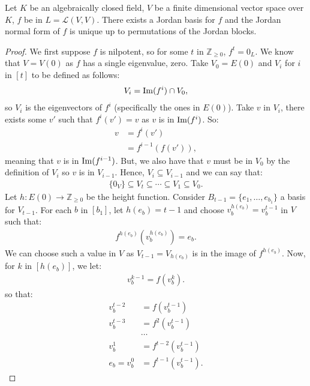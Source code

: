 Let $K$ be an algebraically closed field, $V$ be a finite dimensional 
vector space over $K$, $f$ be in $L = \mathcal{L}(V, V)$. There exists a Jordan
basis for $f$ and the Jordan normal form of $f$ is unique up to permutations
of the Jordan blocks.
\begin{proof}
    We first suppose $f$ is nilpotent, so for some $t$ in 
    $\mathbb{Z}_{\geq 0}$, $f^t = 0_L$. We know that $V = V(0)$
    as $f$ has a single eigenvalue, zero. Take $V_0 = E(0)$
    and $V_i$ for $i$ in $[t]$ to be defined as follows:
    \begin{gather*}
        V_i = \operatorname{Im}(f^i) \cap V_0,
    \end{gather*} so $V_i$ is the eigenvectors of $f^i$ (specifically
    the ones in $E(0)$). Take $v$ in $V_i$, 
    there exists some $v'$ such that $f^i(v') = v$ 
    as $v$ is in $\operatorname{Im}(f^i)$. So: \begin{align*}
        v &= f^i(v') \\
        &= f^{i - 1}(f(v')),
    \end{align*} meaning that $v$ is in $\operatorname{Im}(f^{i - 1})$. But, we also
    have that $v$ must be in $V_0$ by the definition of $V_i$ so
    $v$ is in $V_{i - 1}$. Hence, $V_i \subseteq V_{i - 1}$ and we 
    can say that: \begin{gather*}
        \{0_V\} \subseteq V_t \subseteq \cdots \subseteq V_1 \subseteq V_0.
    \end{gather*} Let $h : E(0) \to \mathbb{Z}_{\geq 0}$ be the height
    function.
    Consider $B_{t - 1} = \{e_1, \ldots, e_{b_1}\}$ a basis
    for $V_{t - 1}$. For each $b$ in $[b_1]$, let $h(e_b) = t - 1$ and
    choose $v_b^{h(e_b)} = v_b^{t - 1}$ in $V$ such that: \begin{gather*}
        f^{h(e_b)}(v_b^{h(e_b)}) = e_b.
    \end{gather*} We can choose such a value in $V$ as $V_{t - 1} = V_{h(e_b)}$
    is in the image of $f^{h(e_b)}$. Now, for $k$ in $[h(e_b)]$, we let: \begin{gather*}
        v_b^{k - 1} = f(v_b^k).
    \end{gather*} so that: \begin{align*}
        v_b^{t - 2} &= f(v_b^{t - 1}) \\
        v_b^{t - 3} &= f^2(v_b^{t - 1}) \\
        &\cdots \\
        v_b^1 &= f^{t - 2}(v_b^{t - 1}) \\
        e_b = v_b^0 &= f^{t - 1}(v_b^{t - 1}).
    \end{align*}

\end{proof}

